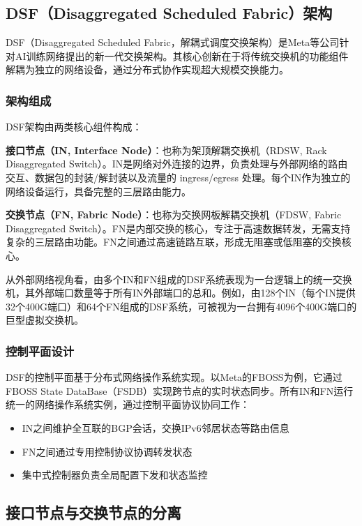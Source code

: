 \subsection{DSF（Disaggregated Scheduled Fabric）架构}

DSF（Disaggregated Scheduled Fabric，解耦式调度交换架构）是Meta等公司针对AI训练网络提出的新一代交换架构。其核心创新在于将传统交换机的功能组件解耦为独立的网络设备，通过分布式协作实现超大规模交换能力。

\subsubsection{架构组成}

DSF架构由两类核心组件构成：

\textbf{接口节点（IN, Interface Node）}：也称为架顶解耦交换机（RDSW, Rack Disaggregated Switch）。IN是网络对外连接的边界，负责处理与外部网络的路由交互、数据包的封装/解封装以及流量的 ingress/egress 处理。每个IN作为独立的网络设备运行，具备完整的三层路由能力。

\textbf{交换节点（FN, Fabric Node）}：也称为交换网板解耦交换机（FDSW, Fabric Disaggregated Switch）。FN是内部交换的核心，专注于高速数据转发，无需支持复杂的三层路由功能。FN之间通过高速链路互联，形成无阻塞或低阻塞的交换核心。

从外部网络视角看，由多个IN和FN组成的DSF系统表现为一台逻辑上的统一交换机，其外部端口数量等于所有IN外部端口的总和。例如，由128个IN（每个IN提供32个400G端口）和64个FN组成的DSF系统，可被视为一台拥有4096个400G端口的巨型虚拟交换机。

\subsubsection{控制平面设计}

DSF的控制平面基于分布式网络操作系统实现。以Meta的FBOSS为例，它通过FBOSS State DataBase（FSDB）实现跨节点的实时状态同步。所有IN和FN运行统一的网络操作系统实例，通过控制平面协议协同工作：

\begin{itemize}
    \item IN之间维护全互联的BGP会话，交换IPv6邻居状态等路由信息
    \item FN之间通过专用控制协议协调转发状态
    \item 集中式控制器负责全局配置下发和状态监控
\end{itemize}

\subsection{接口节点与交换节点的分离}


